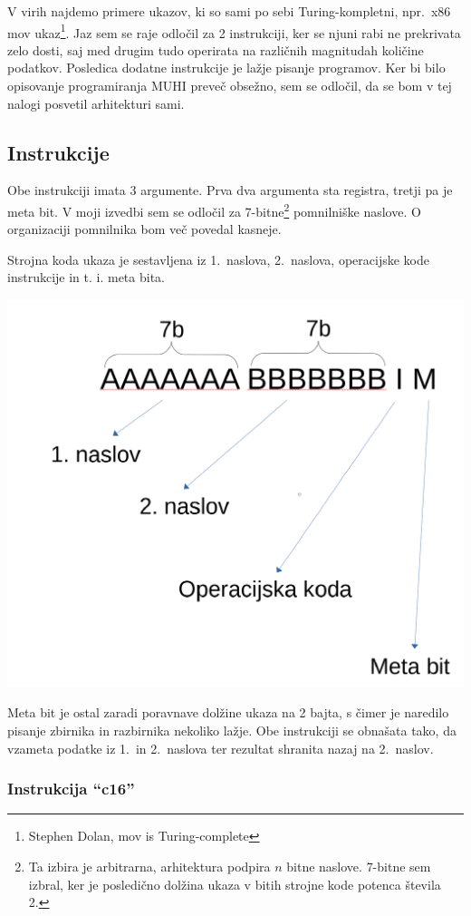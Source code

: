 \documentclass[12pt]{article}
\begin{document}
V virih najdemo primere ukazov, ki so sami po sebi Turing-kompletni, npr.\ x86 mov ukaz\footnote{Stephen Dolan, mov is Turing-complete}.
Jaz sem se raje odločil za 2 instrukciji, ker se njuni rabi ne prekrivata zelo dosti, saj med drugim tudo operirata na različnih magnitudah količine podatkov.
Posledica dodatne instrukcije je lažje pisanje programov.
Ker bi bilo opisovanje programiranja MUHI preveč obsežno, sem se odločil, da se bom v tej nalogi posvetil arhitekturi sami.

\subsection{Instrukcije}
Obe instrukciji imata 3 argumente.
Prva dva argumenta sta registra, tretji pa je meta bit.
V moji izvedbi sem se odločil za 7-bitne\footnote{Ta izbira je arbitrarna, arhitektura podpira $n$ bitne naslove. 7-bitne sem izbral, ker je posledično dolžina ukaza v bitih strojne kode potenca števila 2.} pomnilniške naslove.
O organizaciji pomnilnika bom več povedal kasneje.

Strojna koda ukaza je sestavljena iz 1.\ naslova, 2.\ naslova, operacijske kode instrukcije in t. i. meta bita.

\begin{center}
  \includegraphics[width=.3\linewidth]{slike/zločinski_posnetek_zaslona.png}
\end{center}

Meta bit je ostal zaradi poravnave dolžine ukaza na 2 bajta, s čimer je naredilo pisanje zbirnika in razbirnika nekoliko lažje.
Obe instrukciji se obnašata tako, da vzameta podatke iz 1.\ in 2.\ naslova ter rezultat shranita nazaj na 2.\ naslov.
\pagebreak
\subsubsection{Instrukcija ``c16''}
\end{document}
